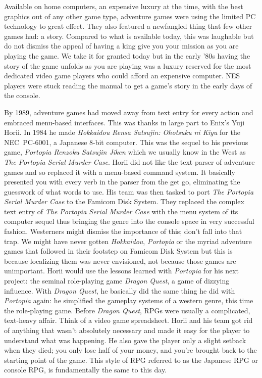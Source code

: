 \documentclass{book}
\begin{document}
Available on home computers, an expensive luxury at the time, with the best graphics out of any other game type, adventure games were using the limited PC technology to great effect. They also featured a newfangled thing that few other games had: a story. Compared to what is available today, this was laughable but do not dismiss the appeal of having a king give you your mission as you are playing the game. We take it for granted today but in the early ’80s having the story of the game unfolds as you are playing was a luxury reserved for the most dedicated video game players who could afford an expensive computer. NES players were stuck reading the manual to get a game’s story in the early days of the console.

By 1989, adventure games had moved away from text entry for every action and embraced menu-based interfaces. This was thanks in large part to Enix’s Yuji Horii. In 1984 he made \emph{Hokkaidou Rensa Satsujin: Ohotsuku ni Kiyu} for the NEC PC-6001, a Japanese 8-bit computer. This was the sequel to his previous game, \emph{Portopia Renzoku Satsujin Jiken} which we usually know in the West as \emph{The Portopia Serial Murder Case}. Horii did not like the text parser of adventure games and so replaced it with a menu-based command system. It basically presented you with every verb in the parser from the get go, eliminating the guesswork of what words to use. His team was then tasked to port \emph{The Portopia Serial Murder Case} to the Famicom Disk System. They replaced the complex text entry of \emph{The Portopia Serial Murder Case} with the menu system of its computer sequel thus bringing the genre into the console space in very successful fashion. Westerners might dismiss the importance of this; don’t fall into that trap. We might have never gotten \emph{Hokkaidou}, \emph{Portopia} or the myriad adventure games that followed in their footstep on Famicom Disk System but this is because localizing them was never envisioned, not because those games are unimportant. Horii would use the lessons learned with \emph{Portopia} for his next project: the seminal role-playing game \emph{Dragon Quest}, a game of dizzying influence. With \emph{Dragon Quest}, he basically did the same thing he did with \emph{Portopia} again: he simplified the gameplay systems of a western genre, this time the role-playing game. Before \emph{Dragon Quest}, RPGs were usually a complicated, text-heavy affair. Think of a video game spreadsheet. Horii and his team got rid of anything that wasn’t absolutely necessary and made it easy for the player to understand what was happening. He also gave the player only a slight setback when they died; you only lose half of your money, and you’re brought back to the starting point of the game. This style of RPG referred to as the Japanese RPG or console RPG, is fundamentally the same to this day.
\end{document}
